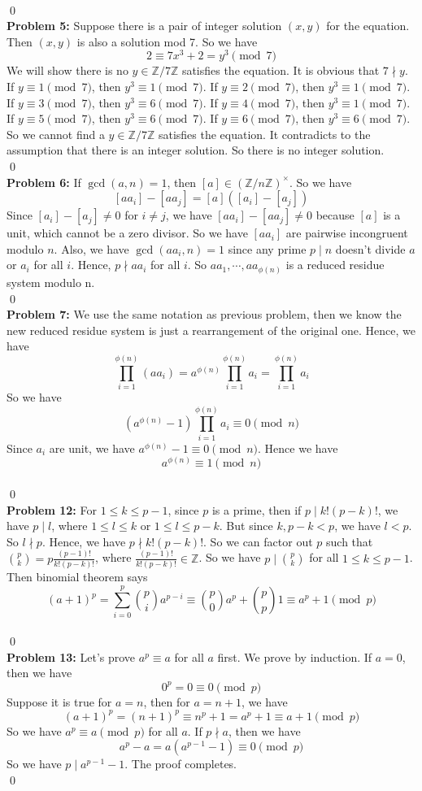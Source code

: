 \documentclass[12pt]{amsart}
\newcommand{\Z}{\mathbb{Z}}
\begin{document}
\\\qed\\
\textbf{Problem 5:} Suppose there is a pair of integer solution $(x,y)$ for the equation. Then $(x,y)$ is also a solution mod 7. So we have 
\[2\equiv 7x^3+2=y^3\pmod{7}\]
We will show there is no $y\in\Z/7\Z$ satisfies the equation. It is obvious that $7\nmid y$. If $y\equiv 1\pmod{7}$, then $y^3\equiv 1\pmod{7}$. If $y\equiv 2\pmod{7}$, then $y^3\equiv 1\pmod{7}$. If $y\equiv 3\pmod{7}$, then $y^3\equiv 6\pmod{7}$. If $y\equiv 4\pmod{7}$, then $y^3\equiv 1\pmod{7}$. If $y\equiv 5\pmod{7}$, then $y^3\equiv 6\pmod{7}$. If $y\equiv 6\pmod{7}$, then $y^3\equiv 6\pmod{7}$. So we cannot find a $y\in \Z/7\Z$ satisfies the equation. It contradicts to the assumption that there is an integer solution. So there is no integer solution.
\\\qed\\
\textbf{Problem 6:} If $\gcd(a,n)=1$, then $[a]\in (\Z/n\Z)^\times$. So we have 
\[[aa_i]-[aa_j]=[a]([a_i]-[a_j])\]
Since $[a_i]-[a_j]\neq 0$ for $i\neq j$, we have $[aa_i]-[aa_j]\neq 0$ because $[a]$ is a unit, which cannot be a zero divisor. So we have $[aa_i]$ are pairwise incongruent modulo $n$. Also, we have $\gcd(aa_i,n)=1$ since any prime $p\mid n$ doesn't divide $a$ or $a_i$ for all $i$. Hence, $p\nmid aa_i$ for all $i$. So $aa_1,\cdots, aa_{\phi(n)}$ is a reduced residue system modulo n.
\\\qed\\
\textbf{Problem 7:} We use the same notation as previous problem, then we know the new reduced residue system is just a rearrangement of the original one. Hence, we have 
\[\prod_{i=1}^{\phi(n)}(aa_i)=a^{\phi(n)}\prod_{i=1}^{\phi(n)}a_i=\prod_{i=1}^{\phi(n)}a_i\]
So we have 
\[(a^{\phi(n)}-1)\prod_{i=1}^{\phi(n)}a_i\equiv 0\pmod n\]
Since $a_i$ are unit, we have $a^{\phi(n)}-1\equiv 0\pmod n$. Hence we have 
\[a^{\phi(n)}\equiv 1\pmod n\]
\\\qed\\
\textbf{Problem 12:}
For $1\leq k\leq p-1$, since $p$ is a prime, then if $p\mid k!(p-k)!$, we have $p\mid l$, where $1\leq l\leq k$ or $1\leq l\leq p-k$. But since $k,p-k<p$, we have $l<p$. So $l\nmid p$. Hence, we have $p\nmid k!(p-k)!$. So we can factor out $p$ such that ${p\choose{k}} =p\frac{(p-1)!}{k!(p-k)!}$, where $\frac{(p-1)!}{k!(p-k)!}\in\Z$. So we have $p\mid {p\choose{k}}$ for all $1\leq k\leq p-1$. Then binomial theorem says
\[(a+1)^p=\sum_{i=0}^p{p\choose{i}}a^{p-i}\equiv {p\choose{0}}a^p+{p\choose{p}}1\equiv a^p+1\pmod{p}\]
\\\qed\\
\textbf{Problem 13:} Let's prove $a^p\equiv a$ for all $a$ first. We prove by induction. If $a=0$, then we have 
\[0^p=0\equiv 0\pmod p\]
Suppose it is true for $a=n$, then for $a=n+1$, we have 
\[(a+1)^p=(n+1)^p\equiv n^p+1=a^p+1\equiv a+1\pmod p \]
So we have $a^p\equiv a\pmod p$ for all $a$. If $p\nmid a$, then we have 
\[a^p-a=a(a^{p-1}-1)\equiv 0\pmod p\]
So we have $p\mid a^{p-1}-1$. The proof completes.
\\\qed\\
\end{document}
